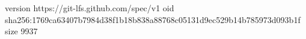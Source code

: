 version https://git-lfs.github.com/spec/v1
oid sha256:1769ca63407b7984d38f1b18b838a88768c05131d9ec529b14b785973d093b1f
size 9937
